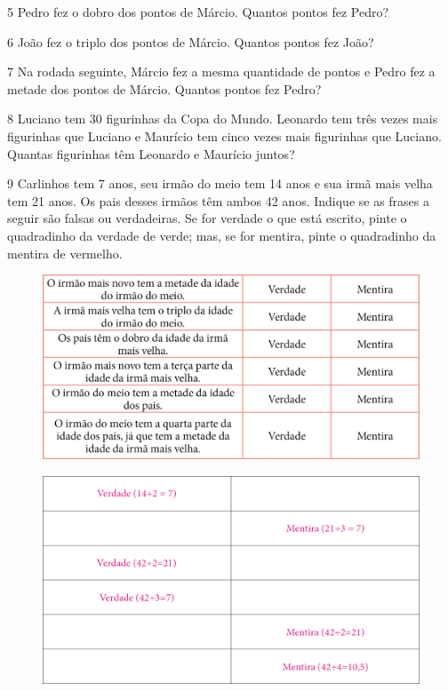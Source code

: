 \num{5} Pedro fez o dobro dos pontos de Márcio. Quantos pontos fez Pedro?


\num{6} João fez o triplo dos pontos de Márcio. Quantos pontos fez João?


\num{7} Na rodada seguinte, Márcio fez a mesma quantidade de pontos e Pedro
  fez a metade dos pontos de Márcio. Quantos pontos fez Pedro?


\num{8} Luciano tem 30 figurinhas da Copa do Mundo. Leonardo tem três
vezes mais figurinhas que Luciano e Maurício tem cinco vezes mais figurinhas que Luciano.
Quantas figurinhas têm Leonardo e Maurício juntos?




\num{9} Carlinhos tem 7 anos, seu irmão do meio tem 14 anos e sua irmã mais
velha tem 21 anos. Os pais desses irmãos têm ambos 42 anos. Indique se
as frases a seguir são falsas ou verdadeiras. Se for verdade o que está
escrito, pinte o quadradinho da verdade de verde; mas, se for mentira,
pinte o quadradinho da mentira de vermelho.

\begin{figure}[htpb!]
\includegraphics[width=\textwidth]{./media/image109.png}
\end{figure}

\begin{figure}[htpb!]
\includegraphics[width=\textwidth]{./media/image110.png}
\end{figure}

